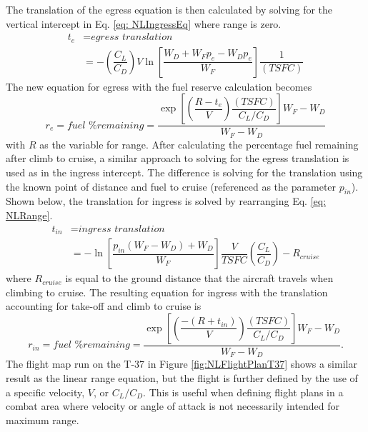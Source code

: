 The translation of the egress equation is then calculated by solving for the vertical intercept in Eq. \ref{eq: NLIngressEq} where range is zero.
\begin{equation}
\begin{aligned}
    t_{e}&= \textit{egress translation} \\ &=-\left(\dfrac{C_L}{C_D}\right)V\ln\left[\dfrac{W_D+W_Fp_e- W_Dp_e}{W_F}\right]\dfrac{1}{(TSFC)}
\end{aligned}
\end{equation}
The new equation for egress with the fuel reserve calculation becomes
\begin{equation}
    r_{e} = \textit{fuel \% remaining} =\dfrac{\exp\left[\left(\dfrac{R-t_{e}}{V}\right)\dfrac{(TSFC)}{C_L/C_D}\right]W_F-W_D}{W_F - W_D}
    \label{eq: NLIngressFull}
\end{equation}
with $R$ as the variable for range. After calculating the percentage fuel remaining after climb to cruise, a similar approach to solving for the egress translation is used as in the ingress intercept. The difference is solving for the translation using the known point of distance and fuel to cruise (referenced as the parameter $p_{in}$). Shown below, the translation for ingress is solved by rearranging Eq. \ref{eq: NLRange}. 
\begin{equation}
\begin{aligned}
    t_{in} &= \textit{ingress translation}\\
    &=-\ln\left[\dfrac{p_{in}(W_F-W_D)+W_D}{W_F}\right]\dfrac{V}{TSFC}\left(\dfrac{C_L}{C_D}\right)-R_{cruise}
\end{aligned}
\end{equation}
where $R_{cruise}$ is equal to the ground distance that the aircraft travels when climbing to cruise. The resulting equation for ingress with the translation accounting for take-off and climb to cruise is 
\begin{equation}
    r_{in} = \textit{fuel \% remaining} = \dfrac{\exp\left[\left(\dfrac{-(R+t_{in})}{V}\right)\dfrac{(TSFC)}{C_L/C_D}\right]W_F-W_D}{W_F - W_D}.
    \label{eq: NLEgressEqFull}
\end{equation}
The flight map run on the T-37 in Figure \ref{fig:NLFlightPlanT37} shows a similar result as the linear range equation, but the flight is further defined by the use of a specific velocity, $V$, or $C_L/C_D$. This is useful when defining flight plans in a combat area where velocity or angle of attack is not necessarily intended for maximum range.
